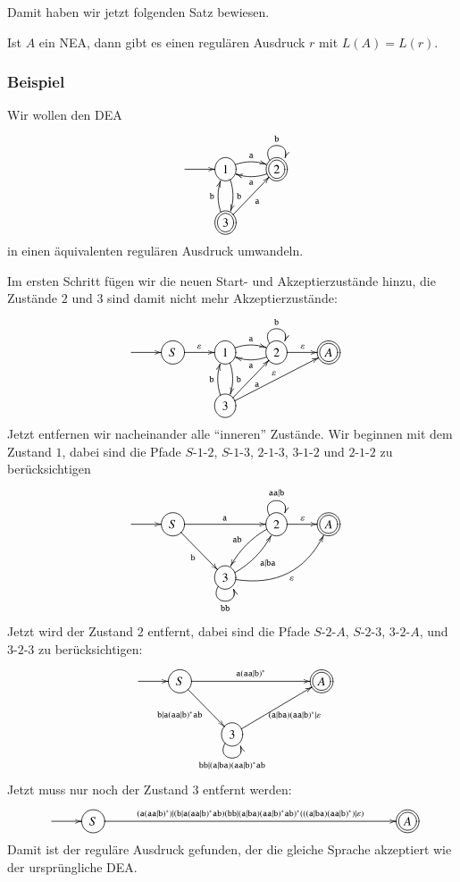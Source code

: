 Damit  haben wir jetzt folgenden Satz bewiesen.
\begin{satz}
Ist $A$ ein NEA, dann gibt es einen regulären Ausdruck $r$ mit
$L(A)=L(r)$.
\end{satz}

\subsubsection{Beispiel}
Wir wollen den DEA
\[
\entrymodifiers={++[o][F]}
\xymatrix{
*+\txt{}\ar[r]
	&{1}\ar@/^/[r]^{\tt a} \ar@/^/[d]^{\tt b}
		&*++[o][F=]{2} \ar@(ul,ur)^{\tt b} \ar@/^/[l]^{\tt a}
\\
*+\txt{}
	&*++[o][F=]{3} \ar[ur]_{\tt a} \ar@/^/[u]^{\tt b}
}
\]
in einen äquivalenten regulären Ausdruck umwandeln.

Im ersten Schritt fügen wir die neuen Start- und Akzeptierzustände 
hinzu, die Zustände $2$ und $3$ sind damit nicht mehr Akzeptierzustände:
\[
\entrymodifiers={++[o][F]}
\xymatrix{
*+\txt{}\ar[r]
	&S\ar[r]^{\varepsilon}
		&{1}\ar@/^/[r]^{\tt a} \ar@/^/[d]^{\tt b}
			&{2} \ar@(ul,ur)^{\tt b} \ar@/^/[l]^{\tt a}\ar[r]^{\varepsilon}
				&*++[o][F=]{A}
\\
*+\txt{}
	&*+\txt{}
		&{3} \ar[ur]_{\tt a} \ar@/^/[u]^{\tt b} \ar[urr]^{\varepsilon}
}
\]
Jetzt entfernen wir nacheinander alle ``inneren'' Zustände.
Wir beginnen mit dem Zustand $1$, dabei sind die Pfade
$S$-$1$-$2$,
$S$-$1$-$3$,
$2$-$1$-$3$,
$3$-$1$-$2$
und
$2$-$1$-$2$
zu berücksichtigen
\[
\entrymodifiers={++[o][F]}
\xymatrix{
*+\txt{}\ar[r]
	&S\ar[rr]^{\tt a} \ar[dr]_{\tt b}
		&*+\txt{}
			&{2} \ar@(ul,ur)^{\tt aa|b} \ar@/_/[dl]_{\tt ab} \ar[r]^{\varepsilon}
				&*++[o][F=]{A}
\\
*+\txt{}
	&*+\txt{}
		&{3} \ar@/_/[ur]_{\tt a|ba} \ar@/_20pt/[urr]_{\varepsilon} \ar@(dl,dr)_{\tt bb}
}
\]
Jetzt wird der Zustand $2$ entfernt, dabei sind die Pfade 
$S$-$2$-$A$,
$S$-$2$-$3$,
$3$-$2$-$A$,
und
$3$-$2$-$3$
zu berücksichtigen:
\[
\entrymodifiers={++[o][F]}
\xymatrix{
*+\txt{}\ar[r]
	&S\ar[rrr]^{\tt a(aa|b)^*} \ar[dr]_{\tt b|a(aa|b)^*ab}
		&*+\txt{}
			&*+\txt{}
				&*++[o][F=]{A}
\\
*+\txt{}
	&*+\txt{}
		&{3} \ar[urr]_{{\tt (a|ba)(aa|b)^*}|\varepsilon} \ar@(dl,dr)_{{\tt bb|(a|ba)(aa|b)^*ab}}
}
\]
Jetzt muss nur noch der Zustand $3$ entfernt werden:
\[
\entrymodifiers={++[o][F]}
\xymatrix{
*+\txt{}\ar[r]
	&S\ar[rrrrrrrr]^{\tt (a(aa|b)^*)|(b|a(aa|b)^*ab)(bb|(a|ba)(aa|b)^*ab)^*(((a|ba)(aa|b)^*)|\varepsilon)}
		&*+\txt{}
			&*+\txt{}
			&*+\txt{}
			&*+\txt{}
			&*+\txt{}
			&*+\txt{}
			&*+\txt{}
				&*++[o][F=]{A}
}
\]
Damit ist der reguläre Ausdruck gefunden, der die gleiche Sprache
akzeptiert wie der ursprüngliche DEA.


